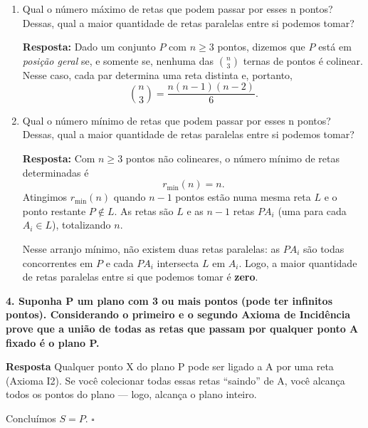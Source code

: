 \documentclass[12pt,a4paper]{article}
\begin{document}
\begin{enumerate}[label=\alph*)]

    \item Qual o número máximo de retas que podem passar por esses n pontos? Dessas, qual a maior quantidade de retas paralelas entre si podemos tomar?

    \textbf{Resposta:} Dado um conjunto $P$ com $n\ge 3$ pontos, dizemos que $P$ está em \emph{posição geral}
    se, e somente se, nenhuma das $\binom{n}{3}$ ternas de pontos é colinear.
    Nesse caso, cada par determina uma reta distinta e, portanto,
    \[
    \binom{n}{3}=\frac{n(n-1)(n-2)}{6}.
    \]

    \item Qual o número mínimo de retas que podem passar por esses n pontos? Dessas, qual a maior quantidade de retas paralelas entre si podemos tomar?

    \textbf{Resposta:}
    Com $n\ge 3$ pontos não colineares, o número mínimo de retas determinadas é
    \[
    r_{\min}(n)=n.
    \]
    Atingimos $r_{\min}(n)$ quando $n-1$ pontos estão numa mesma reta $L$ e o ponto restante
    $P\notin L$. As retas são $L$ e as $n-1$ retas $PA_i$ (uma para cada $A_i\in L$), totalizando $n$.
    
    Nesse arranjo mínimo, não existem duas retas paralelas:
    as $PA_i$ são todas concorrentes em $P$ e cada $PA_i$ intersecta $L$ em $A_i$.
    Logo, a maior quantidade de retas paralelas entre si que podemos tomar é \textbf{zero}.

\end{enumerate}

\vspace{0.8cm}

\textbf {4. Suponha P um plano com 3 ou mais pontos (pode ter infinitos pontos). Considerando o primeiro e o
segundo Axioma de Incidência prove que a união de todas as retas que passam por qualquer ponto A fixado
é o plano P.}

\vspace{0.4cm}

\textbf{Resposta} Qualquer ponto X do plano P pode ser ligado a A por uma reta (Axioma I2). Se você colecionar todas essas retas “saindo” de A, você alcança todos os pontos do plano — logo, alcança o plano inteiro.

Concluímos $S=P$.
\hfill$\square$

\vspace{0.8cm}
\end{document}

